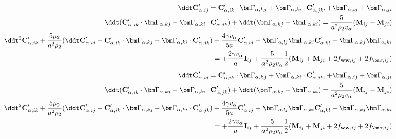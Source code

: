\begin{align*}
    \ddt \textbf{C}_{\alpha,ij}'
    = 
    \textbf{C}_{\alpha,ik}' \cdot \bm\Gamma_{\alpha,kj}
    +  \bm\Gamma_{\alpha,ki} \cdot \textbf{C}_{\alpha,jk}',
    + \bm\Gamma_{\alpha,ij}
    +  \bm\Gamma_{\alpha,ji}
    \\
    \ddt( 
    \textbf{C}_{\alpha,ik}' \cdot \bm\Gamma_{\alpha,kj}
    -  \bm\Gamma_{\alpha,ki} \cdot \textbf{C}_{\alpha,jk}')
    + \ddt (\bm\Gamma_{\alpha,kj} -  \bm\Gamma_{\alpha,ki})
    = 
    \frac{5}{a^2 \rho_2 v_\alpha} (\textbf{M}_{ij} - \textbf{M}_{ji})\\
    \ddt^2 \textbf{C}_{\alpha,ik}'
    + \frac{5\mu_2}{a^2\rho_2} (
        \ddt \textbf{C}_{\alpha,ij}'
        - \textbf{C}_{\alpha,ik}' \cdot \bm\Gamma_{\alpha,kj}
        - \bm\Gamma_{\alpha,ki} \cdot \textbf{C}_{\alpha,jk}'
        )
    + \frac{4 \gamma v_\alpha }{5 a} \textbf{C}_{\alpha,ij}'
    - \bm\Gamma_{\alpha,lj}\bm\Gamma_{\alpha,ki} \textbf{C}_{\alpha,kl}'
    - \bm\Gamma_{\alpha,kj}\bm\Gamma_{\alpha,ki} 
    \\
    = 
    +\frac{2 \gamma v_\alpha }{a} \textbf{I}_{ij} 
    +\frac{5}{a^2 \rho_2 v_\alpha} \frac{1}{2}(\textbf{M}_{ij}+\textbf{M}_{ji} + 2f_{\textbf{ww},ij} + 2f_{\bm\sigma,ij})
\end{align*}
\begin{align*}
    \ddt \textbf{C}_{\alpha,ij}'
    = 
    \textbf{C}_{\alpha,ik}' \cdot \bm\Gamma_{\alpha,kj}
    +  \bm\Gamma_{\alpha,ki} \cdot \textbf{C}_{\alpha,jk}',
    + \bm\Gamma_{\alpha,ij}
    +  \bm\Gamma_{\alpha,ji}
    \\
    \ddt( 
    \textbf{C}_{\alpha,ik}' \cdot \bm\Gamma_{\alpha,kj}
    -  \bm\Gamma_{\alpha,ki} \cdot \textbf{C}_{\alpha,jk}')
    + \ddt (\bm\Gamma_{\alpha,kj} -  \bm\Gamma_{\alpha,ki})
    = 
    \frac{5}{a^2 \rho_2 v_\alpha} (\textbf{M}_{ij} - \textbf{M}_{ji})\\
    \ddt^2 \textbf{C}_{\alpha,ik}'
    + \frac{5\mu_2}{a^2\rho_2} (
        \ddt \textbf{C}_{\alpha,ij}'
        - \textbf{C}_{\alpha,ik}' \cdot \bm\Gamma_{\alpha,kj}
        - \bm\Gamma_{\alpha,ki} \cdot \textbf{C}_{\alpha,jk}'
        )
    + \frac{4 \gamma v_\alpha }{5 a} \textbf{C}_{\alpha,ij}'
    - \bm\Gamma_{\alpha,lj}\bm\Gamma_{\alpha,ki} \textbf{C}_{\alpha,kl}'
    - \bm\Gamma_{\alpha,kj}\bm\Gamma_{\alpha,ki} 
    \\
    = 
    +\frac{2 \gamma v_\alpha }{a} \textbf{I}_{ij} 
    +\frac{5}{a^2 \rho_2 v_\alpha} \frac{1}{2}(\textbf{M}_{ij}+\textbf{M}_{ji} + 2f_{\textbf{ww},ij} + 2f_{\bm\sigma,ij})
    \label{eq:dt2_C}
\end{align*}


